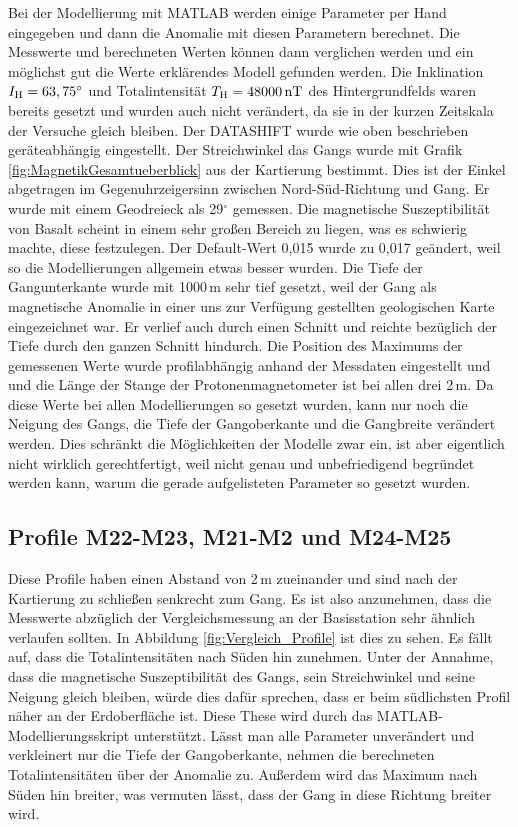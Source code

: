 Bei der Modellierung mit MATLAB werden einige Parameter per Hand eingegeben und dann die Anomalie mit diesen Parametern berechnet. Die Messwerte und berechneten Werten können dann verglichen werden und ein möglichst gut die Werte erklärendes Modell gefunden werden. Die Inklination $I_{\mathrm{H}}=63,75^\circ$ und Totalintensität $T_{\mathrm{H}}=48000\,\mathrm{nT}$ des Hintergrundfelds waren bereits gesetzt und wurden auch nicht verändert, da sie in der kurzen Zeitskala der Versuche gleich bleiben. Der DATASHIFT wurde wie oben beschrieben geräteabhängig eingestellt. Der Streichwinkel das Gangs wurde mit Grafik \ref{fig:MagnetikGesamtueberblick} aus der Kartierung bestimmt. Dies ist der Einkel abgetragen im Gegenuhrzeigersinn zwischen Nord-Süd-Richtung und Gang. Er wurde mit einem Geodreieck als 29$^\circ$ gemessen. Die magnetische Suszeptibilität von Basalt scheint in einem sehr großen Bereich zu liegen, was es schwierig machte, diese festzulegen. Der Default-Wert 0,015 wurde zu 0,017 geändert, weil so die Modellierungen allgemein etwas besser wurden. Die Tiefe der Gangunterkante wurde mit 1000\,m sehr tief gesetzt, weil der Gang als magnetische Anomalie in einer uns zur Verfügung gestellten geologischen Karte eingezeichnet war. Er verlief auch durch einen Schnitt und reichte bezüglich der Tiefe durch den ganzen Schnitt hindurch. Die Position des Maximums der gemessenen Werte wurde profilabhängig anhand der Messdaten eingestellt und und die Länge der Stange der Protonenmagnetometer ist bei allen drei 2\,m. Da diese Werte bei allen Modellierungen so gesetzt wurden, kann nur noch die Neigung des Gangs, die Tiefe der Gangoberkante und die Gangbreite verändert werden.
Dies schränkt die Möglichkeiten der Modelle zwar ein, ist aber eigentlich nicht wirklich gerechtfertigt, weil nicht genau und unbefriedigend begründet werden kann, warum die gerade aufgelisteten Parameter so gesetzt wurden.


\subsection{Profile M22-M23, M21-M2 und M24-M25}

Diese Profile haben einen Abstand von 2\,m zueinander und sind nach der Kartierung zu schließen senkrecht zum Gang. Es ist also anzunehmen, dass die Messwerte abzüglich der Vergleichsmessung an der Basisstation sehr ähnlich verlaufen sollten. In Abbildung \ref{fig:Vergleich_Profile} ist dies zu sehen. Es fällt auf, dass die Totalintensitäten nach Süden hin zunehmen. Unter der Annahme, dass die magnetische Suszeptibilität des Gangs, sein Streichwinkel und seine Neigung gleich bleiben, würde dies dafür sprechen, dass er beim südlichsten Profil näher an der Erdoberfläche ist. Diese These wird durch das MATLAB-Modellierungsskript unterstützt. Lässt man alle Parameter unverändert und verkleinert nur die Tiefe der Gangoberkante, nehmen die berechneten Totalintensitäten über der Anomalie zu. Außerdem wird das Maximum nach Süden hin breiter, was vermuten lässt, dass der Gang in diese Richtung breiter wird.


